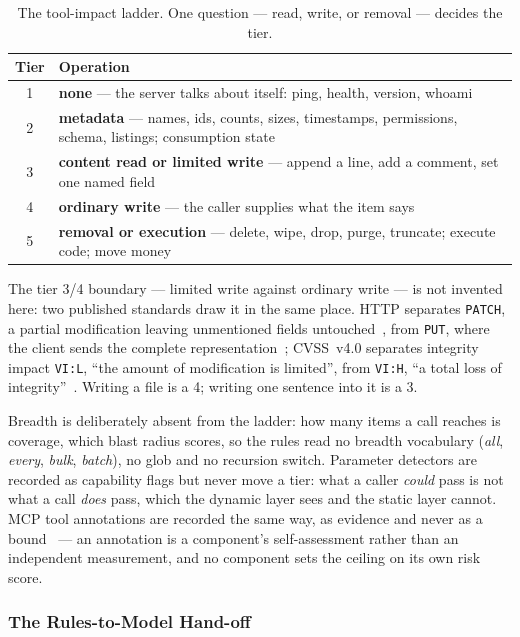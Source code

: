 \begin{table}[t]
\caption{The tool-impact ladder. One question --- read, write, or removal ---
decides the tier.}
\label{tab:ladder}
\small
\begin{tabular}{@{}cp{}@{}}
\toprule
Tier & Operation \\
\midrule
1 & \textbf{none} --- the server talks about itself: ping, health, version,
    whoami \\
2 & \textbf{metadata} --- names, ids, counts, sizes, timestamps, permissions,
    schema, listings; consumption state \\
3 & \textbf{content read or limited write} --- append a line, add a comment,
    set one named field \\
4 & \textbf{ordinary write} --- the caller supplies what the item says \\
5 & \textbf{removal or execution} --- delete, wipe, drop, purge, truncate;
    execute code; move money \\
\bottomrule
\end{tabular}
\end{table}

The tier 3/4 boundary --- limited write against ordinary write --- is not
invented here: two published standards draw it in the same place. HTTP
separates \texttt{PATCH}, a partial modification leaving unmentioned fields
untouched~\cite{dusseault2010patch}, from \texttt{PUT}, where the client sends
the complete representation~\cite{fielding2022http}; CVSS~v4.0 separates
integrity impact \texttt{VI:L}, ``the amount of modification is limited'', from
\texttt{VI:H}, ``a total loss of integrity''~\cite{first2023cvss4}. Writing a
file is a 4; writing one sentence into it is a 3.

Breadth is deliberately absent from the ladder: how many items a call reaches
is coverage, which blast radius scores, so the rules read no breadth vocabulary
(\emph{all}, \emph{every}, \emph{bulk}, \emph{batch}), no glob and no recursion
switch. Parameter detectors are recorded as capability
flags but never move a tier: what a caller \emph{could} pass is not what a call
\emph{does} pass, which the dynamic layer sees and the static layer cannot. MCP tool annotations are
recorded the same way, as evidence and never as a
bound~\cite{mcp2026spec} --- an annotation is a component's self-assessment
rather than an independent measurement, and no component sets the ceiling on
its own risk score.

\subsubsection{The Rules-to-Model Hand-off}
\label{sec:handoff}


